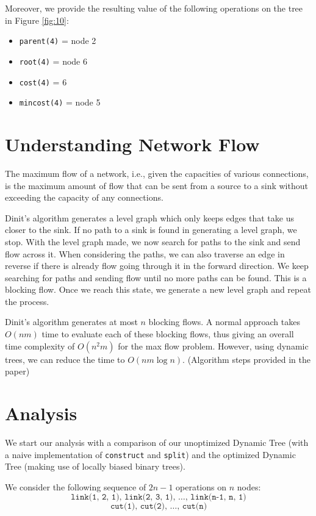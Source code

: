\documentclass[a4paper, 11pt]{article}
\begin{document}
Moreover, we provide the resulting value of the following operations on the tree in Figure \ref{fig:10}:
\begin{itemize}
    \item \texttt{parent(4)} = node 2
    \item \texttt{root(4)} = node 6
    \item \texttt{cost(4)} = 6
    \item \texttt{mincost(4)} = node 5
\end{itemize}

\pagebreak

\section{Understanding Network Flow}

The maximum flow of a network, i.e., given the capacities of various connections, is the maximum amount of flow that can be sent from a source to a sink without exceeding the capacity of any connections.

Dinit’s algorithm generates a level graph which only keeps edges that take us closer to the sink. If no path to a sink is found in generating a level graph, we stop. With the level graph made, we now search for paths to the sink and send flow across it. When considering the paths, we can also traverse an edge in reverse if there is already flow going through it in the forward direction. We keep searching for paths and sending flow until no more paths can be found. This is a blocking flow. Once we reach this state, we generate a new level graph and repeat the process.

Dinit’s algorithm generates at most \(n\) blocking flows. A normal approach takes \(O(nm)\) time to evaluate each of these blocking flows, thus giving an overall time complexity of \(O(n^2m)\) for the max flow problem. However, using dynamic trees, we can reduce the time to \(O(nm\log n)\). (Algorithm steps provided in the paper)

\pagebreak

\section{Analysis}
We start our analysis with a comparison of our unoptimized Dynamic Tree (with a naive implementation of \texttt{construct} and \texttt{split}) and the optimized Dynamic Tree (making use of locally biased binary trees).

We consider the following sequence of \(2n-1\) operations on \(n\) nodes:
\[
\texttt{link(1, 2, 1), link(2, 3, 1), \ldots, link(n-1, n, 1)}
\]
\[
\texttt{cut(1), cut(2), \ldots, cut(n)}
\]
\end{document}
